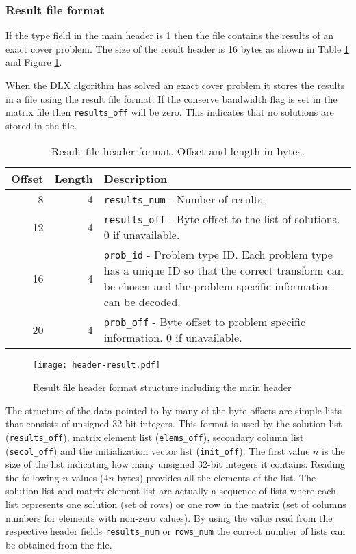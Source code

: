 \subsubsection{Result file format}

If the type field in the main header is 1 then the file contains the results of an exact cover problem.
The size of the result header is 16 bytes as shown in Table \ref{tab:header-result} and Figure \ref{fig:header-result}.

When the DLX algorithm has solved an exact cover problem it stores the results in a file using the result file format.
If the conserve bandwidth flag is set in the matrix file then \texttt{results\_off} will be zero.
This indicates that no solutions are stored in the file.

\begin{table}[htbp]
	\centering
	\begin{tabular}{|r|r|p{3.2in}|}
		\hline
		\bf Offset & \bf Length & \bf Description \\ \hline
		8  & 4 & \texttt{results\_num} - Number of results. \\ \hline
		12 & 4 & \texttt{results\_off} - Byte offset to the list of solutions. 0 if unavailable. \\ \hline
		16 & 4 & \texttt{prob\_id} - Problem type ID. Each problem type has a unique ID so that the correct transform can be chosen and the problem specific information can be decoded. \\ \hline
		20 & 4 & \texttt{prob\_off} - Byte offset to problem specific information. 0 if unavailable. \\ \hline
	\end{tabular}
	\caption{Result file header format. Offset and length in bytes.}
	\label{tab:header-result}
\end{table}

\begin{figure}[htbp]
	\centering
	\texttt{[image: header-result.pdf]}
	\caption{Result file header format structure including the main header}
	\label{fig:header-result}
\end{figure}



The structure of the data pointed to by many of the byte offsets are simple lists that consists of unsigned 32-bit integers.
This format is used by the solution list (\texttt{results\_off}), matrix element list (\texttt{elems\_off}), secondary column list (\texttt{secol\_off}) and the initialization vector list (\texttt{init\_off}).
The first value $n$ is the size of the list indicating how many unsigned 32-bit integers it contains.
Reading the following $n$ values ($4n$ bytes) provides all the elements of the list.
The solution list and matrix element list are actually a sequence of lists where each list represents one solution (set of rows) or one row in the matrix (set of columns numbers for elements with non-zero values).
By using the value read from the respective header fields \texttt{results\_num} or \texttt{rows\_num} the correct number of lists can be obtained from the file.



